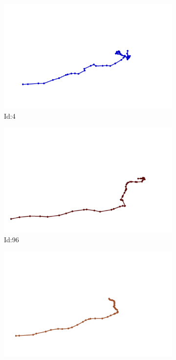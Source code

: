 \documentclass[12pt,twoside]{report}
\begin{document}
\begin{figure}
\centering
\begin{subfigure}[b]{0.20\textwidth}
\centering
\includegraphics[width=\textwidth]{../../trajectories/4.png}
\caption{Id:4}
\end{subfigure}
\begin{subfigure}[b]{0.20\textwidth}
\centering
\includegraphics[width=\textwidth]{../../trajectories/96.png}
\caption{Id:96}
\end{subfigure}
\begin{subfigure}[b]{0.20\textwidth}
\centering
\includegraphics[width=\textwidth]{../../trajectories/254.png}

\end{subfigure}
\end{figure}
\end{document}
